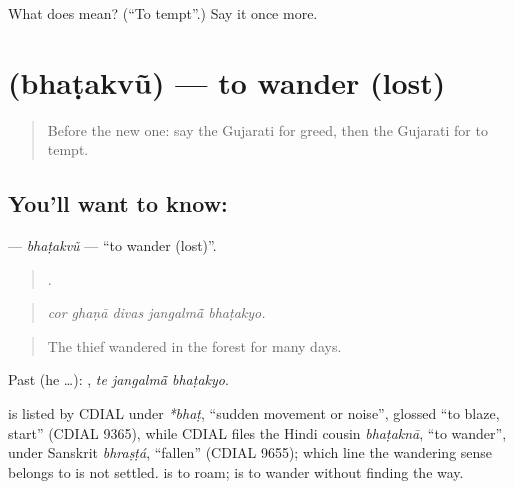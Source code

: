 \begin{tcolorbox}[breakable,colback=teal!4,colframe=teal!35!black,title={Before you move on}]
What does  mean? (\textquotedblleft{}To tempt\textquotedblright{}.) Say it once more.
\end{tcolorbox}
\section[\texorpdfstring{\gu{ભટકવું} (bhaṭakvũ)}{ભટકવું (bhaṭakvũ)}]{ (bhaṭakvũ) — to wander (lost)}

\label{lesson:GU-C334-bhatakvu}



\begin{quote}
Before the new one: say the Gujarati for greed, then the Gujarati for to tempt.
\end{quote}

\subsection*{You'll want to know: }
\textbf{} — \emph{bhaṭakvũ} — \textquotedblleft{}to wander (lost)\textquotedblright{}.

\begin{quote}
    .
\end{quote}

\begin{quote}
\emph{cor ghaṇā divas jangalmā̃ bhaṭakyo.}
\end{quote}

\begin{quote}
The thief wandered in the forest for many days.
\end{quote}

Past (he …):   , \emph{te jangalmā̃ bhaṭakyo}.

\begin{cousinweb}
is listed by CDIAL under \emph{*bhaṭ}, \textquotedblleft{}sudden movement or noise\textquotedblright{}, glossed \textquotedblleft{}to blaze, start\textquotedblright{} (CDIAL 9365), while CDIAL files the Hindi cousin \emph{bhaṭaknā}, \textquotedblleft{}to wander\textquotedblright{}, under Sanskrit \emph{bhraṣṭá}, \textquotedblleft{}fallen\textquotedblright{} (CDIAL 9655); which line the wandering sense belongs to is not settled. \textbf{} is to roam; \textbf{} is to wander without finding the way.
\end{cousinweb}


